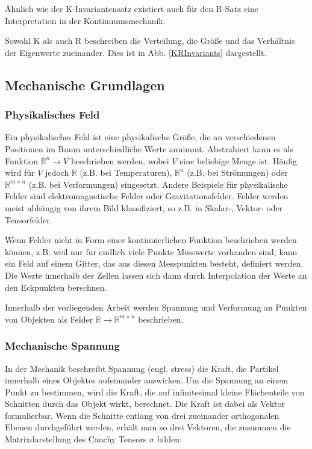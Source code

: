 \documentclass[a4paper,fontsize=12pt,toc=bib,halfparskip]{scrartcl}
\begin{document}
\"Ahnlich wie der K-Invariantensatz existiert auch f\"ur den R-Satz eine Interpretation in der Kontinuumsmechanik. 

Sowohl K als auch R beschreiben die Verteilung, die Gr\"o{\ss}e und das Verh\"altnis der Eigenwerte zueinander. Dies ist in Abb. \ref{KRInvariants} dargestellt. 

\subsection{Mechanische Grundlagen}
\subsubsection{Physikalisches Feld}
Ein physikalisches Feld ist eine physikalische Gr\"o{\ss}e, die an verschiedenen Positionen im Raum unterschiedliche Werte annimmt\cite[1–2 Electric and magnetic fields]{feynman2011feynman}. Abstrahiert kann es als Funktion $\mathbb{R}^n \rightarrow V$ beschrieben werden, wobei $V$ eine beliebige Menge ist. H\"aufig wird f\"ur $V$ jedoch $\mathbb{R}$ (z.B. bei Temperaturen), $\mathbb{R}^n$ (z.B. bei Str\"omungen) oder $\mathbb{R}^{m\times n}$ (z.B. bei Verformungen) eingesetzt. Andere Beispiele f\"ur physikalische Felder sind elektromagnetische Felder oder Gravitationsfelder. Felder werden meist abh\"angig von ihrem Bild klassifiziert, so z.B. in Skalar-, Vektor- oder Tensorfelder.

Wenn Felder nicht in Form einer kontinuierlichen Funktion beschrieben werden k\"onnen, z.B. weil nur f\"ur endlich viele Punkte Messwerte vorhanden sind, kann ein Feld auf einem Gitter, das aus diesen Messpunkten besteht, definiert werden. Die Werte innerhalb der Zellen lassen sich dann durch Interpolation der Werte an den Eckpunkten berechnen.


Innerhalb der vorliegenden Arbeit werden Spannung und Verformung an Punkten von Objekten als Felder $\mathbb{R} \rightarrow \mathbb{R}^{m\times n}$ beschrieben.


\subsubsection{Mechanische Spannung}
In der Mechanik beschreibt Spannung (engl. stress) die Kraft, die Partikel innerhalb eines Objektes aufeinander auswirken. Um die Spannung an einem Punkt zu bestimmen, wird die Kraft, die auf infinitesimal kleine Fl\"achenteile von Schnitten durch das Objekt wirkt, berechnet. Die Kraft ist dabei als Vektor formulierbar. Wenn die Schnitte entlang von drei zueinander orthogonalen Ebenen durchgef\"uhrt werden, erh\"alt man so drei Vektoren, die zusammen die Matrixdarstellung des Cauchy Tensors $\sigma$ bilden:
\end{document}

